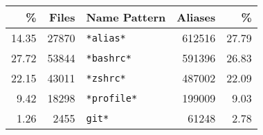 \begin{tabular}{rrlrr}
    \toprule
             \% &         Files &           Name Pattern &        Aliases &           \% \\
    \midrule
    \num{14.35} & \num{27870}  &                        \verb|*alias*| & \num{612516}  & \num{27.79} \\
    \num{27.72} & \num{53844}  &                       \verb|*bashrc*| & \num{591396}  & \num{26.83} \\
    \num{22.15} & \num{43011}  &                        \verb|*zshrc*| & \num{487002}  & \num{22.09} \\
     \num{9.42} & \num{18298}  &                      \verb|*profile*| & \num{199009}  &  \num{9.03} \\
     \num{1.26} &  \num{2455}  &                           \verb|git*| &  \num{61248}  &  \num{2.78} \\
    \bottomrule
\end{tabular}
